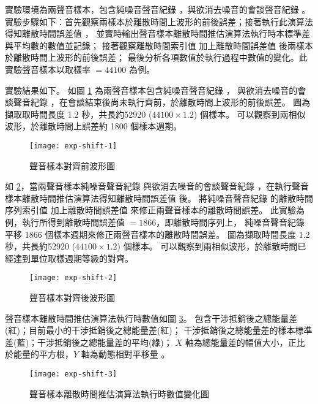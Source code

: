     實驗環境為兩聲音樣本，包含純噪音聲音紀錄 \DEFrecN，與欲消去噪音的會談聲音紀錄 \DEFrecJ。
實驗步驟如下：首先觀察兩樣本於離散時間上波形的前後誤差；接著執行此演算法得知離散時間誤差值 \DEFshift，
並實時輸出聲音樣本離散時間推估演算法執行時本標準差與平均數的數值並記錄；
接著觀察離散時間索引值 \DEFpause 加上離散時間誤差值 \DEFshift 後兩樣本於離散時間上波形的前後誤差；
最後分析各項數值於執行過程中數值的變化。此實驗聲音樣本以取樣率 \DEFsamplerate $= 44100$ 為例。

    實驗結果如下。
如圖 \ref{fig:exp-shift-1} 為兩聲音樣本包含純噪音聲音紀錄 \DEFrecN，
與欲消去噪音的會談聲音紀錄 \DEFrecJ，在會談結束後尚未執行齊前，於離散時間上波形的前後誤差。
圖為擷取取時間長度 1.2 秒，共長約52920 ($44100 \times 1.2 $) 個樣本。
可以觀察到兩相似波形，於離散時間上誤差約 1800 個樣本週期。

\begin{figure}[H]
    \centering
    \texttt{[image: exp-shift-1]}
    \caption{聲音樣本對齊前波形圖}\label{fig:exp-shift-1}
\end{figure}

    如 \ref{fig:exp-shift-2}，當兩聲音樣本純噪音聲音紀錄 \DEFrecN
與欲消去噪音的會談聲音紀錄 \DEFrecJ，在執行聲音樣本離散時間推估演算法得知離散時間誤差值 \DEFshift 後。
將純噪音聲音紀錄 \DEFrecN 的離散時間序列索引值 \DEFpause 加上離散時間誤差值 \DEFshift
來修正兩聲音樣本的離散時間誤差。
此實驗為例，執行所得到離散時間誤差值 \DEFshift $=1866$，即離散時間序列上，
純噪音聲音紀錄 \DEFrecN 平移 $1866$ 個樣本週期來修正兩聲音樣本的離散時間誤差。
圖為擷取時間長度 1.2 秒，共長約52920 ($44100 \times 1.2 $) 個樣本。
可以觀察到兩相似波形，於離散時間已經達到單位取樣週期等級的對齊。

\begin{figure}[H]
    \centering
    \texttt{[image: exp-shift-2]}
    \caption{聲音樣本對齊後波形圖}\label{fig:exp-shift-2}
\end{figure}

    聲音樣本離散時間推估演算法執行時數值如圖 \ref{fig:exp-shift-3}。
包含干涉抵銷後之總能量差(紅)；目前最小的干涉抵銷後之總能量差(紅)；
干涉抵銷後之總能量差的樣本標準差(藍)；干涉抵銷後之總能量差的平均(綠)；
$X$ 軸為總能量差的幅值大小，正比於能量的平方根，$Y$ 軸為動態相對平移量 \DEFcandiSFT。

\begin{figure}[H]
    \centering
    \texttt{[image: exp-shift-3]}
    \caption{聲音樣本離散時間推估演算法執行時數值變化圖}\label{fig:exp-shift-3}
\end{figure}

